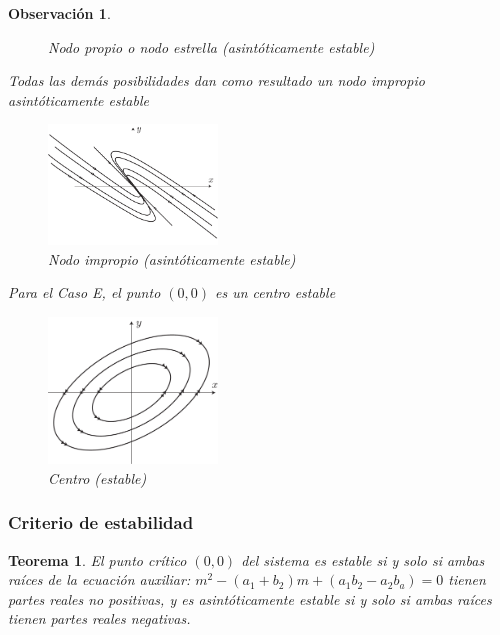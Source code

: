 \documentclass[a5paper,doc,10pt,noapacite]{apa6}
\newtheorem{teorema}{Teorema}
\newtheorem{observ}{Observación}
\begin{document}
{{\begin{observ}
\begin{APAenumerate}
\begin{figure}[H]
		\caption{Nodo propio o nodo estrella (asintóticamente estable)}
		\label{fig:M-14}
	\end{figure}
		
		
		\item Todas las demás posibilidades dan como resultado un nodo impropio asintóticamente estable
		\vspace{-1\baselineskip}
	\begin{figure}[H]
		\captionsetup{justification=centering, labelfont=footnotesize, font=footnotesize}
		\centering
		\includegraphics[width=4.5cm]{Graficos/figura15}
	
		\caption{Nodo impropio (asintóticamente estable)}
		\label{fig:M-15}
	\end{figure}
	\end{APAenumerate}

Para el Caso E, el punto \((0,0)\) es un centro estable
\vspace{-1\baselineskip}
	\begin{figure}[H]
		\captionsetup{justification=centering, labelfont=footnotesize, font=footnotesize}
		\centering
		\includegraphics[width=4.5cm]{Graficos/figura6}
	
		\caption{Centro (estable)}
		\label{fig:M-16}
	\end{figure}
\end{observ}


%
\subsubsection{Criterio de estabilidad}


\begin{teorema}\label{teo-2}
	El punto crítico \((0,0)\) del sistema es estable si y solo si  ambas raíces de la ecuación auxiliar: \(m^2-(a_1+b_2)m+(a_1b_2-a_2b_a)=0\) tienen partes reales no positivas, y es  asintóticamente estable si y solo si 	ambas raíces tienen partes reales negativas.
\end{teorema}

}}
\end{document}
